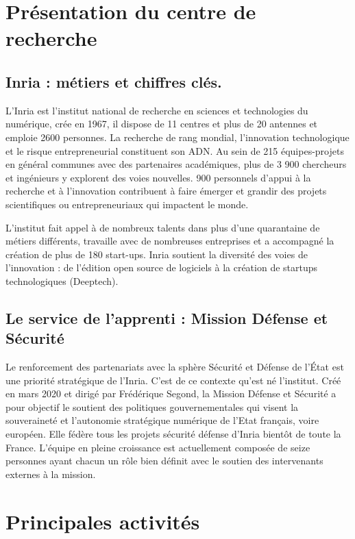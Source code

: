 \section{Présentation du centre de recherche}
\label{chap:sectionone}
\sloppy


\subsection{Inria : métiers et chiffres clés.}

L’Inria est l’institut national de recherche en sciences et technologies du numérique, crée en 1967, il dispose de 11 centres et plus de 20 antennes et emploie 2600 personnes. La recherche de rang mondial, l’innovation technologique et le risque entrepreneurial constituent son ADN.
Au sein de 215 équipes-projets en général communes avec des partenaires académiques, plus de 3 900 chercheurs et ingénieurs y explorent des voies nouvelles. 900 personnels d’appui à la recherche et à l’innovation contribuent à faire émerger et grandir des projets scientifiques ou entrepreneuriaux qui impactent le monde.

L’institut fait appel à de nombreux talents dans plus d’une quarantaine de métiers différents, travaille avec de nombreuses entreprises et a accompagné la création de plus de 180 start-ups.
Inria soutient la diversité des voies de l’innovation : de l’édition open source de logiciels à la création de startups technologiques (Deeptech).


\subsection{Le service de l’apprenti : Mission Défense et Sécurité}

Le renforcement des partenariats avec la sphère Sécurité et Défense de l’État est une priorité stratégique de l’Inria. C’est de ce contexte qu’est né l’institut. Créé en mars 2020 et dirigé par Frédérique Segond, la Mission Défense et Sécurité a pour objectif le soutient des politiques gouvernementales qui visent la souveraineté et l’autonomie stratégique numérique de l’Etat français, voire européen. Elle fédère tous les projets sécurité défense d’Inria bientôt de toute la France.
L’équipe en pleine croissance est actuellement composée de seize personnes ayant chacun un rôle bien définit avec le soutien des intervenants externes à la mission.

\section{Principales activités}


